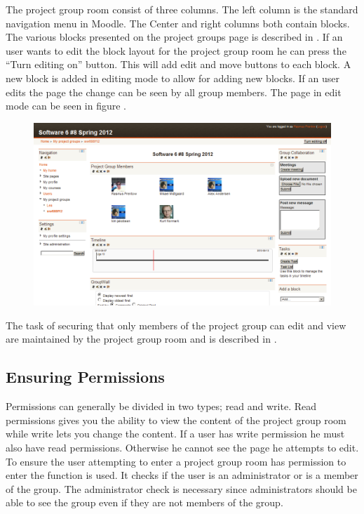 The project group room consist of three columns. 
The left column is the standard navigation menu in Moodle. 
The Center and right columns both contain blocks.
The various blocks presented on the project groups page is described in . 
If an user wants to edit the block layout for the project group room he can press the ``Turn editing on'' button. 
This will add edit and move buttons to each block. 
A new block is added in editing mode to allow for adding new blocks. 
If an user edits the page the change can be seen by all group members. 
The page in edit mode can be seen in figure .

\begin{figure}[h]
	\centering
		\includegraphics[width=\textwidth]{images/projectgroupwithedit.png}
	\label{fig:projectgroupwithedit}
\end{figure}


The task of securing that only members of the project group can edit and view are maintained by the project group room and is described in . 




\subsection{Ensuring Permissions}
\label{sec:projectgrouproommanagerights}
Permissions can generally be divided in two types; read and write. 
Read permissions gives you the ability to view the content of the project group room while write lets you change the content. 
If a user has write permission he must also have read permissions. 
Otherwise he cannot see the page he attempts to edit. 
To ensure the user attempting to enter a project group room has permission to enter the function  is used. 
It checks if the user is an administrator or is a member of the group. 
The administrator check is necessary since administrators should be able to see the group even if they are not members of the group. 

